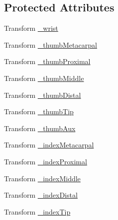 \subsection*{Protected Attributes}
\begin{DoxyCompactItemize}
\item 
Transform \mbox{\hyperlink{class_valve_1_1_v_r_1_1_steam_v_r___behaviour___skeleton_custom_aa81db1c257e2139e0464a94d85fad179}{\+\_\+wrist}}
\item 
Transform \mbox{\hyperlink{class_valve_1_1_v_r_1_1_steam_v_r___behaviour___skeleton_custom_a5ca124a98bca46401c11335d1d7492f6}{\+\_\+thumb\+Metacarpal}}
\item 
Transform \mbox{\hyperlink{class_valve_1_1_v_r_1_1_steam_v_r___behaviour___skeleton_custom_ad30660af75d77a1d5f37eb58d70203af}{\+\_\+thumb\+Proximal}}
\item 
Transform \mbox{\hyperlink{class_valve_1_1_v_r_1_1_steam_v_r___behaviour___skeleton_custom_af00efc0dd7d7c0f4d12872db32308a91}{\+\_\+thumb\+Middle}}
\item 
Transform \mbox{\hyperlink{class_valve_1_1_v_r_1_1_steam_v_r___behaviour___skeleton_custom_adf9b073b32ff6aed59203ababa6951f0}{\+\_\+thumb\+Distal}}
\item 
Transform \mbox{\hyperlink{class_valve_1_1_v_r_1_1_steam_v_r___behaviour___skeleton_custom_a25810ac91dd3a8f551ce405cfbb2c835}{\+\_\+thumb\+Tip}}
\item 
Transform \mbox{\hyperlink{class_valve_1_1_v_r_1_1_steam_v_r___behaviour___skeleton_custom_aecc85aa793730ae8fc1baeaf86389a56}{\+\_\+thumb\+Aux}}
\item 
Transform \mbox{\hyperlink{class_valve_1_1_v_r_1_1_steam_v_r___behaviour___skeleton_custom_a8715230e7e9e3e8e1eadc4e13a19c4a2}{\+\_\+index\+Metacarpal}}
\item 
Transform \mbox{\hyperlink{class_valve_1_1_v_r_1_1_steam_v_r___behaviour___skeleton_custom_ad157db2ff11d5d8f69c9f1021a783dab}{\+\_\+index\+Proximal}}
\item 
Transform \mbox{\hyperlink{class_valve_1_1_v_r_1_1_steam_v_r___behaviour___skeleton_custom_a8fd804b67a8013c689732a28e6ce0d69}{\+\_\+index\+Middle}}
\item 
Transform \mbox{\hyperlink{class_valve_1_1_v_r_1_1_steam_v_r___behaviour___skeleton_custom_a0ad73fd49c6caa95c5c8a772032c8be3}{\+\_\+index\+Distal}}
\item 
Transform \mbox{\hyperlink{class_valve_1_1_v_r_1_1_steam_v_r___behaviour___skeleton_custom_a3b568735793a8fd3a743920ae41d2da4}{\+\_\+index\+Tip}}
\item 

\end{DoxyCompactItemize}
